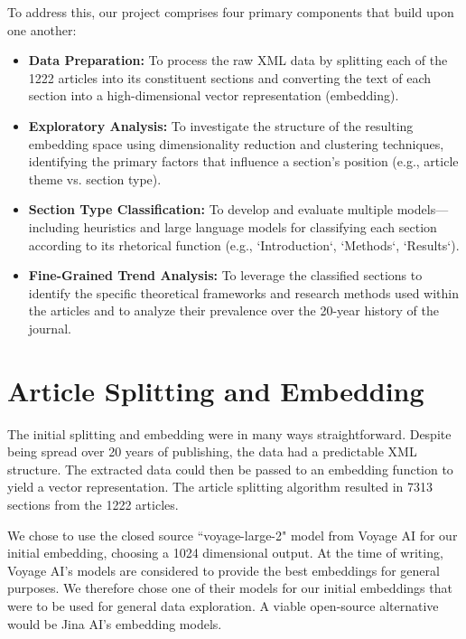 To address this, our project comprises four primary components that build upon
one another:
\begin{itemize}
    \item \textbf{Data Preparation:} To process the raw XML data by splitting
    each of the 1222 articles into its constituent sections and converting the
    text of each section into a high-dimensional vector representation
    (embedding).

    \item \textbf{Exploratory Analysis:} To investigate the structure of the
    resulting embedding space using dimensionality reduction and clustering
    techniques, identifying the primary factors that influence a section's
    position (e.g., article theme vs. section type).

    \item \textbf{Section Type Classification:} To develop and evaluate multiple
    models—including heuristics and large language models for classifying each
    section according to its rhetorical function (e.g., `Introduction`,
    `Methods`, `Results`).

    \item \textbf{Fine-Grained Trend Analysis:} To leverage the classified
    sections to identify the specific theoretical frameworks and research
    methods used within the articles and to analyze their prevalence over the
    20-year history of the journal.
\end{itemize}


\section{Article Splitting and Embedding}

The initial splitting and embedding were in many ways straightforward. Despite
being spread over 20 years of publishing, the data had a predictable XML
structure. The extracted data could then be passed to an embedding function to
yield a vector representation. The article splitting algorithm resulted in 7313
sections from the 1222 articles.

We chose to use the closed source ``voyage-large-2" model from Voyage AI for our
initial embedding, choosing a 1024 dimensional output. At the time of writing,
Voyage AI's models are considered to provide the best embeddings for general
purposes. We therefore chose one of their models for our initial embeddings that
were to be used for general data exploration. A viable open-source alternative
would be Jina AI's embedding models.

